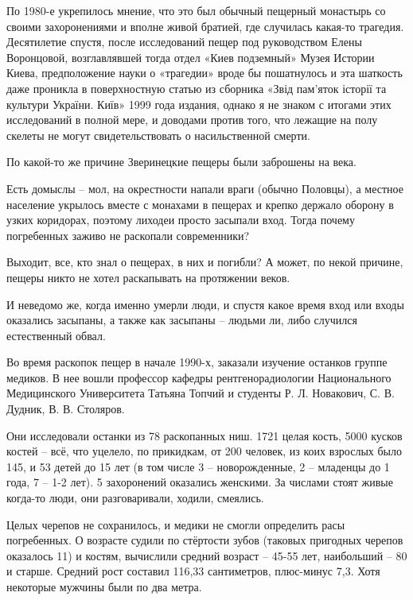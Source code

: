 По 1980-е укрепилось мнение, что это был обычный пещерный монастырь со своими захоронениями и вполне живой братией, где случилась какая-то трагедия. Десятилетие спустя, после исследований пещер под руководством Елены Воронцовой, возглавлявшей тогда отдел «Киев подземный» Музея Истории Киева, предположение науки о «трагедии» вроде бы пошатнулось и эта шаткость даже проникла в поверхностную статью из сборника «Звід пам'яток історії та культури України. Київ» 1999 года издания, однако я не знаком с итогами этих исследований в полной мере, и доводами против того, что лежащие на полу скелеты не могут свидетельствовать о насильственной смерти.

По какой-то же причине Зверинецкие пещеры были заброшены на века.



Есть домыслы – мол, на окрестности напали враги (обычно Половцы), а местное население укрылось вместе с монахами в пещерах и крепко держало оборону в узких коридорах, поэтому лиходеи просто засыпали вход. Тогда почему погребенных заживо не раскопали современники?

Выходит, все, кто знал о пещерах, в них и погибли? А может, по некой причине, пещеры никто не хотел раскапывать на протяжении веков.

И неведомо же, когда именно умерли люди, и спустя какое время вход или входы оказались засыпаны, а также как засыпаны – людьми ли, либо случился естественный обвал.

Во время раскопок пещер в начале 1990-х, заказали изучение останков группе медиков. В нее вошли профессор кафедры рентгенорадиологии Национального Медицинского Университета Татьяна Топчий и студенты Р. Л. Новакович, С. В. Дудник, В. В. Столяров.

Они исследовали останки из 78 раскопанных ниш. 1721 целая кость, 5000 кусков костей – всё, что уцелело, по прикидкам, от 200 человек, из коих взрослых было 145, и 53 детей до 15 лет (в том числе 3 – новорожденные, 2 – младенцы до 1 года, 7 – 1-2 лет). 5 захоронений оказались женскими. За числами стоят живые когда-то люди, они разговаривали, ходили, смеялись.

Целых черепов не сохранилось, и медики не смогли определить расы погребенных. О возрасте судили по стёртости зубов (таковых пригодных черепов оказалось 11) и костям, вычислили средний возраст – 45-55 лет, наибольший – 80 и старше. Средний рост составил 116,33 сантиметров, плюс-минус 7,3. Хотя некоторые мужчины были по два метра.

